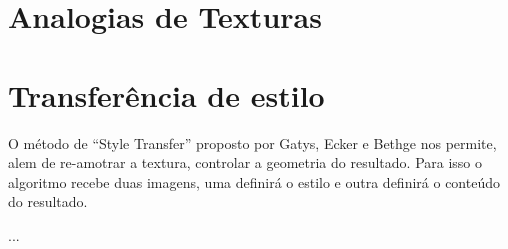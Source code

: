 
\section{Analogias de Texturas}

\cite{Hertzmann2001}

\section{Transferência de estilo} 

O método de ``Style Transfer'' proposto
por Gatys, Ecker e Bethge \cite{Gatys2016}
nos permite, alem de re-amotrar a textura,
controlar a geometria do resultado.
Para isso o algoritmo recebe duas imagens,
uma definirá o estilo
e outra definirá o conteúdo do resultado.

...



